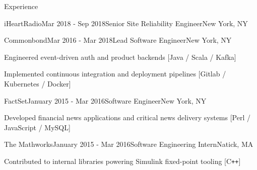 \documentclass{resume} %
\begin{document}
\begin{rSection}{Experience}
\begin{rSubsection}{iHeartRadio}{Mar 2018 - Sep 2018}{Senior Site Reliability Engineer}{New York, NY}
\end{rSubsection}


\begin{rSubsection}{Commonbond}{Mar 2016 - Mar 2018}{Lead Software Engineer}{New York, NY}
\item Engineered event-driven auth and product backends {\footnotesize [Java / Scala / Kafka]}
\item Implemented continuous integration and deployment pipelines {\footnotesize [Gitlab / Kubernetes / Docker]}

\end{rSubsection}


\begin{rSubsection}{FactSet}{January 2015 - Mar 2016}{Software Engineer}{New York, NY}
\item Developed financial news applications and critical news delivery systems {\footnotesize [Perl / JavaScript / MySQL]}

\end{rSubsection}


\begin{rSubsection}{The Mathworks}{January 2015 - Mar 2016}{Software Engineering Intern}{Natick, MA}
\item Contributed to internal libraries powering Simulink fixed-point tooling {\footnotesize [C\texttt{++}]}

\end{rSubsection}
\end{rSection}





\end{document}
